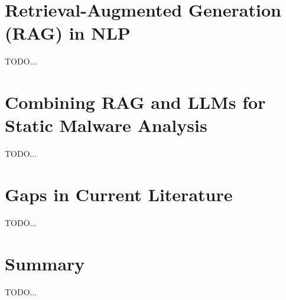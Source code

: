 \section{Retrieval-Augmented Generation (RAG) in NLP}
TODO...

\section{Combining RAG and LLMs for Static Malware Analysis}
TODO...

\section{Gaps in Current Literature}
TODO...

\section{Summary}
TODO...

